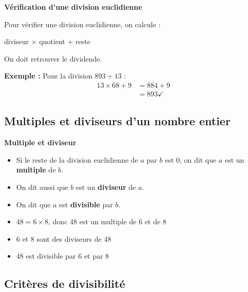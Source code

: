\begin{methodebox}
	\textbf{Vérification d'une division euclidienne}
	
	Pour vérifier une division euclidienne, on calcule :
	\begin{center}
		diviseur × quotient + reste
	\end{center}
	On doit retrouver le dividende.
	
	\textbf{Exemple :} Pour la division $893 \div 13$ :
	\begin{align*}
		13 \times 68 + 9 &= 884 + 9\\
		&= 893 \checkmark
	\end{align*}
\end{methodebox}

\subsection{Multiples et diviseurs d'un nombre entier}

\begin{definitionbox}
	\textbf{Multiple et diviseur}
	\begin{itemize}[label = \textbullet]
		\item Si le reste de la division euclidienne de $a$ par $b$ est 0, on dit que $a$ est un \textbf{multiple} de $b$.
		\item On dit aussi que $b$ est un \textbf{diviseur} de $a$.
		\item On dit que $a$ est \textbf{divisible} par $b$.
	\end{itemize}
\end{definitionbox}

\begin{examplebox}
	\begin{itemize}[label = \textbullet]
		\item $48 = 6 \times 8$, donc 48 est un multiple de 6 et de 8
		\item 6 et 8 sont des diviseurs de 48
		\item 48 est divisible par 6 et par 8
	\end{itemize}
\end{examplebox}

\subsection{Critères de divisibilité}

